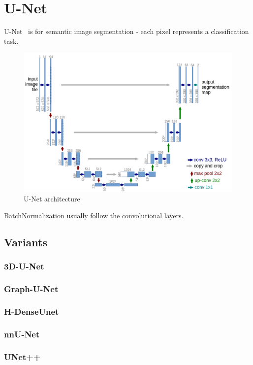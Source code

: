 \documentclass[11pt]{article}
\begin{document}


\tableofcontents

\clearpage

\section{U-Net}

U-Net~\cite{U-Net} is for semantic image segmentation - each pixel represents a classification task.

\begin{figure}[H]
    \includegraphics[width=\linewidth]{figures/U-Net.png}
    \caption{U-Net architecture}
    \label{fig:u-net-architecture}
\end{figure}

BatchNormalization usually follow the convolutional layers.

\subsection{Variants}

\subsubsection{3D-U-Net}
\subsubsection{Graph-U-Net}
\subsubsection{H-DenseUnet}
\subsubsection{nnU-Net}
\subsubsection{UNet++}

\printbibliography
\end{document}
